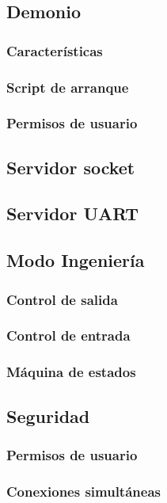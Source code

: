 \smallskip

\subsection{Demonio}

\subsubsection{Características}
\subsubsection{Script de arranque}
\subsubsection{Permisos de usuario}

\subsection{Servidor socket}

\subsection{Servidor UART}

\subsection{Modo Ingeniería}

\subsubsection{Control de salida}
\subsubsection{Control de entrada}
\subsubsection{Máquina de estados}

\subsection{Seguridad}
\subsubsection{Permisos de usuario}
\subsubsection{Conexiones simultáneas}
